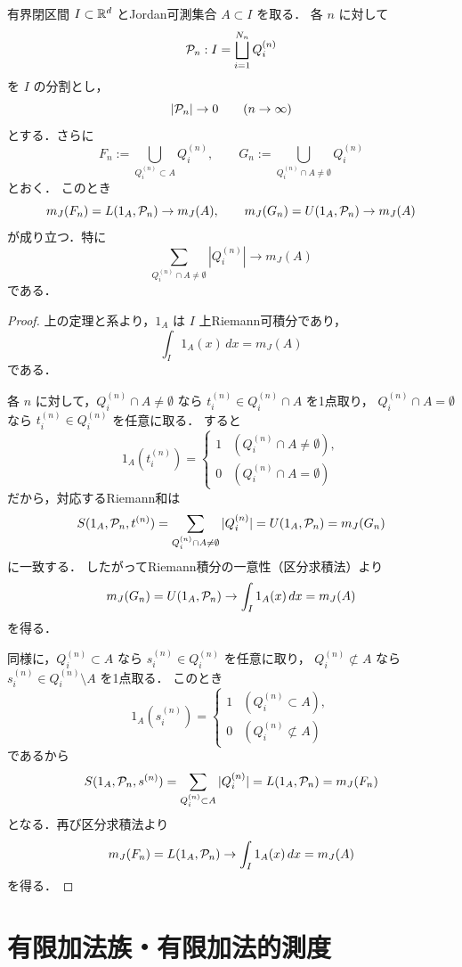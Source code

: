 \begin{theorem}[分割によるJordan測度の近似]
有界閉区間 $I \subset \mathbb R^d$ とJordan可測集合 $A \subset I$ を取る．
各 $n$ に対して
\[
\mathcal P_n : I = \bigsqcup_{i=1}^{N_n} Q_i^{(n)}
\]
を $I$ の分割とし，
\[
|\mathcal P_n| \to 0 \qquad (n\to\infty)
\]
とする．さらに
\[
F_n := \bigcup_{Q_i^{(n)} \subset A} Q_i^{(n)},
\qquad
G_n := \bigcup_{Q_i^{(n)} \cap A \neq \emptyset} Q_i^{(n)}
\]
とおく．
このとき
\[
m_J(F_n)=L(1_A,\mathcal P_n)\to m_J(A),
\qquad
m_J(G_n)=U(1_A,\mathcal P_n)\to m_J(A)
\]
が成り立つ．特に
\[
\sum_{Q_i^{(n)} \cap A \neq \emptyset} |Q_i^{(n)}|
\to m_J(A)
\]
である．
\end{theorem}
\begin{proof}
上の定理と系より，$1_A$ は $I$ 上Riemann可積分であり，
\[
\int_I 1_A(x)\,dx = m_J(A)
\]
である．

各 $n$ に対して，$Q_i^{(n)} \cap A \neq \emptyset$ なら
$t_i^{(n)} \in Q_i^{(n)} \cap A$ を1点取り，
$Q_i^{(n)} \cap A = \emptyset$ なら
$t_i^{(n)} \in Q_i^{(n)}$ を任意に取る．
すると
\[
1_A(t_i^{(n)})=
\begin{cases}
1 & (Q_i^{(n)} \cap A \neq \emptyset),\\
0 & (Q_i^{(n)} \cap A = \emptyset)
\end{cases}
\]
だから，対応するRiemann和は
\[
S(1_A,\mathcal P_n,t^{(n)})
= \sum_{Q_i^{(n)} \cap A \neq \emptyset} |Q_i^{(n)}|
= U(1_A,\mathcal P_n)
= m_J(G_n)
\]
に一致する．
したがってRiemann積分の一意性（区分求積法）より
\[
m_J(G_n)=U(1_A,\mathcal P_n)\to \int_I 1_A(x)\,dx = m_J(A)
\]
を得る．

同様に，$Q_i^{(n)} \subset A$ なら $s_i^{(n)} \in Q_i^{(n)}$ を任意に取り，
$Q_i^{(n)} \not\subset A$ なら $s_i^{(n)} \in Q_i^{(n)} \setminus A$ を1点取る．
このとき
\[
1_A(s_i^{(n)})=
\begin{cases}
1 & (Q_i^{(n)} \subset A),\\
0 & (Q_i^{(n)} \not\subset A)
\end{cases}
\]
であるから
\[
S(1_A,\mathcal P_n,s^{(n)})
= \sum_{Q_i^{(n)} \subset A} |Q_i^{(n)}|
= L(1_A,\mathcal P_n)
= m_J(F_n)
\]
となる．再び区分求積法より
\[
m_J(F_n)=L(1_A,\mathcal P_n)\to \int_I 1_A(x)\,dx = m_J(A)
\]
を得る．
\end{proof}


\section{有限加法族・有限加法的測度}

